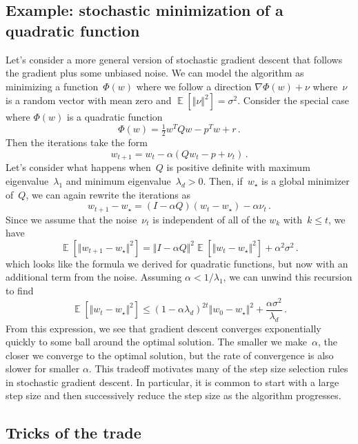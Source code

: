 \documentclass{tufte-book}
\begin{document}
\hypertarget{example-stochastic-minimization-of-a-quadratic-function}{%
\subsection{Example: stochastic minimization of a quadratic
function}\label{example-stochastic-minimization-of-a-quadratic-function}}

Let's consider a more general version of stochastic gradient descent
that follows the gradient plus some unbiased noise. We can model the
algorithm as minimizing a function~\(\Phi(w)\) where we follow a
direction \(\nabla \Phi(w) + \nu\) where~\(\nu\) is a random vector with
mean zero and \(\mathop\mathbb{E}[\Vert \nu \Vert^2] = \sigma^2\).
Consider the special case where \(\Phi(w)\) is a quadratic function \[
    \Phi(w) = \tfrac{1}{2} w^T Q w - p^T w +r\,.
\] Then the iterations take the form \[
    w_{t+1} = w_t - \alpha (  Qw_t -p  + \nu_t)\,.
\] Let's consider what happens when~\(Q\) is positive definite with
maximum eigenvalue~\(\lambda_1\) and minimum
eigenvalue~\(\lambda_d >0\). Then, if~\(w_\star\) is a global minimizer
of~\(Q\), we can again rewrite the iterations as \[
    w_{t+1}-w_\star = (I-\alpha Q) (w_t-w_\star) - \alpha\nu_t\,.
\] Since we assume that the noise~\(\nu_t\) is independent of all of the
\(w_k\) with~\(k \leq t\), we have \[
    \mathop\mathbb{E}[ \Vert w_{t+1}-w_\star \Vert^2 ]= \Vert I-\alpha Q \Vert^2 \mathop\mathbb{E}[ \Vert w_t-w_\star\Vert^2 ] + \alpha^2\sigma^2\,.
\] which looks like the formula we derived for quadratic functions, but
now with an additional term from the noise. Assuming
\(\alpha < 1/\lambda_1\), we can unwind this recursion to find \[
    \mathop\mathbb{E}[ \Vert w_{t}-w_\star \Vert^2 ]\leq ( 1-\alpha \lambda_d)^{2t} \Vert w_0-w_\star\Vert^2  + \frac{\alpha \sigma^2}{\lambda_d}\,.
\] From this expression, we see that gradient descent converges
exponentially quickly to some ball around the optimal solution. The
smaller we make~\(\alpha\), the closer we converge to the optimal
solution, but the rate of convergence is also slower for smaller
\(\alpha\). This tradeoff motivates many of the step size selection
rules in stochastic gradient descent. In particular, it is common to
start with a large step size and then successively reduce the step size
as the algorithm progresses.

\hypertarget{tricks-of-the-trade}{%
\subsection{Tricks of the trade}\label{tricks-of-the-trade}}
\end{document}
